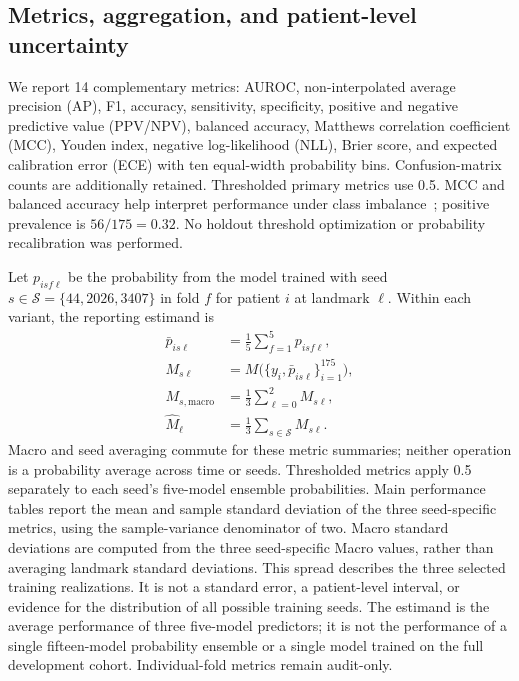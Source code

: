 \subsection{Metrics, aggregation, and patient-level uncertainty}
We report 14 complementary metrics: AUROC, non-interpolated average precision (AP), F1, accuracy, sensitivity, specificity, positive and negative predictive value (PPV/NPV), balanced accuracy, Matthews correlation coefficient (MCC), Youden index, negative log-likelihood (NLL), Brier score, and expected calibration error (ECE) with ten equal-width probability bins. Confusion-matrix counts are additionally retained. Thresholded primary metrics use 0.5. MCC and balanced accuracy help interpret performance under class imbalance~\citep{chicco2020mcc}; positive prevalence is $56/175=0.32$. No holdout threshold optimization or probability recalibration was performed.

Let $p_{isf\ell}$ be the probability from the model trained with seed $s\in\mathcal{S}=\{44,2026,3407\}$ in fold $f$ for patient $i$ at landmark $\ell$. Within each variant, the reporting estimand is
\begin{equation}
\begin{aligned}
 \bar p_{is\ell}&=\frac{1}{5}\sum_{f=1}^{5}p_{isf\ell},\\
 M_{s\ell}&=M\bigl(\{y_i,\bar p_{is\ell}\}_{i=1}^{175}\bigr),\\
 M_{s,\mathrm{macro}}&=\frac{1}{3}\sum_{\ell=0}^{2}M_{s\ell},\\
 \widehat M_\ell&=\frac{1}{3}\sum_{s\in\mathcal{S}}M_{s\ell}.
\end{aligned}
\end{equation}
Macro and seed averaging commute for these metric summaries; neither operation is a probability average across time or seeds. Thresholded metrics apply 0.5 separately to each seed's five-model ensemble probabilities. Main performance tables report the mean and sample standard deviation of the three seed-specific metrics, using the sample-variance denominator of two. Macro standard deviations are computed from the three seed-specific Macro values, rather than averaging landmark standard deviations. This spread describes the three selected training realizations. It is not a standard error, a patient-level interval, or evidence for the distribution of all possible training seeds. The estimand is the average performance of three five-model predictors; it is not the performance of a single fifteen-model probability ensemble or a single model trained on the full development cohort. Individual-fold metrics remain audit-only.

